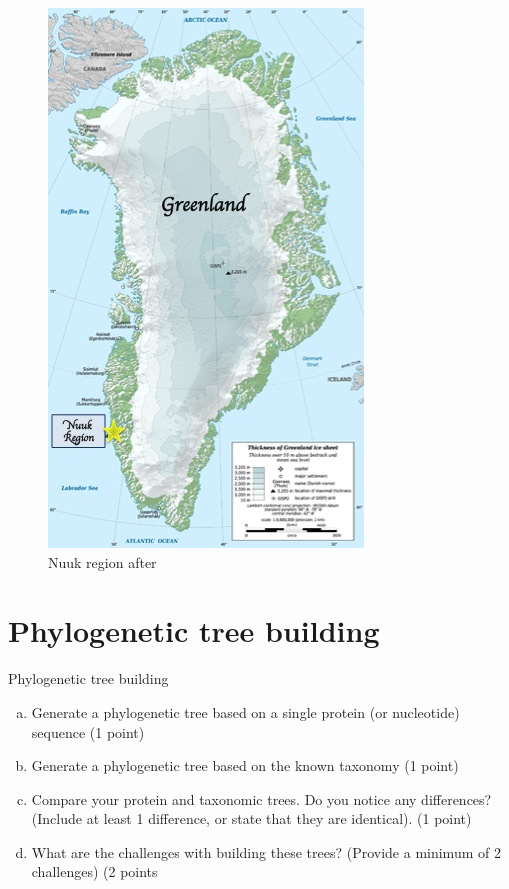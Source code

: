 \documentclass[]{article}
\begin{document}
\begin{figure}[H]
	\caption{Nuuk region after \cite{enwiki:1095301862}}\label{fig:nuuk}
	\includegraphics[width=\textwidth]{Nuuk_Location}
\end{figure}
\section{Phylogenetic tree building}
Phylogenetic tree building \cite{altschul1990basic}
\begin{enumerate}[(a)]
	\item Generate a phylogenetic tree based on a single protein (or nucleotide) sequence (1
point)
	\item Generate a phylogenetic tree based on the known taxonomy (1 point)
	\item Compare your protein and taxonomic trees. Do you notice any differences?
(Include at least 1 difference, or state that they are identical). (1 point)
	\item What are the challenges with building these trees? (Provide a minimum of 2
challenges) (2 points
\end{enumerate}


\printglossaries




\end{document}
